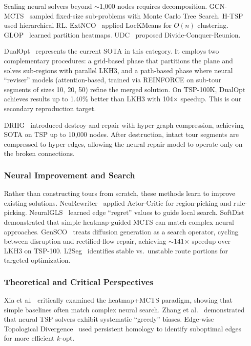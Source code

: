 \documentclass[11pt,a4paper]{article}
\begin{document}
Scaling neural solvers beyond $\sim$1,000 nodes requires decomposition. GCN-MCTS~\cite{fu2021} sampled fixed-size sub-problems with Monte Carlo Tree Search. H-TSP~\cite{pan2023} used hierarchical RL. ExtNCO~\cite{chen2023} applied LocKMeans for $O(n)$ clustering. GLOP~\cite{ye2024} learned partition heatmaps. UDC~\cite{zheng2024} proposed Divide-Conquer-Reunion.

DualOpt~\cite{zhou2025} represents the current SOTA in this category. It employs two complementary procedures: a grid-based phase that partitions the plane and solves sub-regions with parallel LKH3, and a path-based phase where neural ``reviser'' models (attention-based, trained via REINFORCE on sub-tour segments of sizes 10, 20, 50) refine the merged solution. On TSP-100K, DualOpt achieves results up to 1.40\% better than LKH3 with 104$\times$ speedup. This is our secondary reproduction target.

DRHG~\cite{li2025drhg} introduced destroy-and-repair with hyper-graph compression, achieving SOTA on TSP up to 10,000 nodes. After destruction, intact tour segments are compressed to hyper-edges, allowing the neural repair model to operate only on the broken connections.

\subsubsection{Neural Improvement and Search}

Rather than constructing tours from scratch, these methods learn to improve existing solutions. NeuRewriter~\cite{chen2019} applied Actor-Critic for region-picking and rule-picking. NeuralGLS~\cite{neuralgls2024} learned edge ``regret'' values to guide local search. SoftDist~\cite{xia2024softdist} demonstrated that simple heatmap-guided MCTS can match complex neural approaches. GenSCO~\cite{gensco2025} treats diffusion generation as a search operator, cycling between disruption and rectified-flow repair, achieving $\sim$141$\times$ speedup over LKH3 on TSP-100. L2Seg~\cite{xue2024} identifies stable vs.\ unstable route portions for targeted optimization.

\subsubsection{Theoretical and Critical Perspectives}

Xia et al.~\cite{xia2024position} critically examined the heatmap+MCTS paradigm, showing that simple baselines often match complex neural search. Zhang et al.~\cite{zhang2025greedy} demonstrated that neural TSP solvers exhibit systematic ``greedy'' biases. Edge-wise Topological Divergence~\cite{edge2025} used persistent homology to identify suboptimal edges for more efficient $k$-opt.
\end{document}
